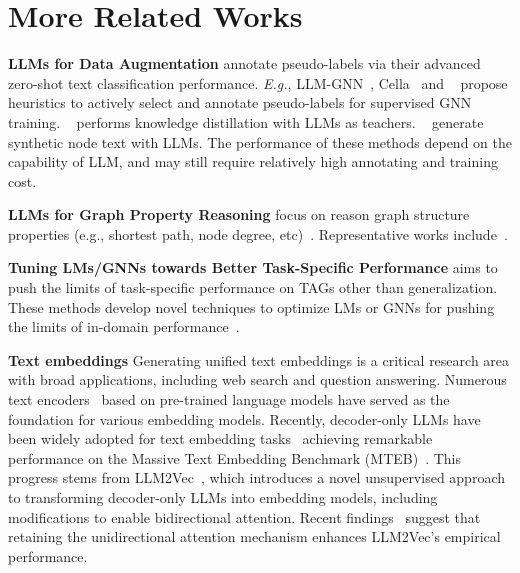 \section{More Related Works}
\label{sec:app_more_related_works}
\textbf{LLMs for Data Augmentation} annotate pseudo-labels via their advanced zero-shot text classification performance. \textit{E.g.}, LLM-GNN~\cite{chen2023label}, Cella~\cite{zhang2024cost} and ~\cite{hu2024low} propose heuristics to actively select and annotate pseudo-labels for supervised GNN training. ~\cite{pan2024distilling} performs knowledge distillation with LLMs as teachers. ~\cite{yu2023empower,li2024enhancing} generate synthetic node text with LLMs. The performance of these methods depend on the capability of LLM, and may still require relatively high annotating and training cost.

\textbf{LLMs for Graph Property Reasoning} focus on reason graph structure properties (e.g., shortest path, node degree, etc)~\cite{tang2024grapharena, dai2024large, yuan2024gracore, ouyang2024gundam}. Representative works include~\cite{perozzi2024let, chen2024graphwiz, zhang2024can, cao2024graphinsight, wei2024gita}.

\textbf{Tuning LMs/GNNs towards Better Task-Specific Performance} aims to push the limits of task-specific performance on TAGs other than generalization. These methods develop novel techniques to optimize LMs or GNNs for pushing the limits of in-domain performance~\cite{chien2021node, duan2023simteg, he2023harnessing, zhao2022learning, zhu2021textgnn, li2021adsgnn, yang2021graphformers, bi2021leveraging, pang2022improving, zolnai2024stage, yang2021graphformers}.

\textbf{Text embeddings} Generating unified text embeddings is a critical research area with broad applications, including web search and question answering. Numerous text encoders~\cite{reimers2019sentence, liu2019roberta, song2020mpnet} based on pre-trained language models have served as the foundation for various embedding models. Recently, decoder-only LLMs have been widely adopted for text embedding tasks~\cite{li2023towards, moreira2024nv} achieving remarkable performance on the Massive Text Embedding Benchmark (MTEB)~\cite{muennighoff2022mteb}. This progress stems from LLM2Vec~\cite{behnamghader2024llm2vec}, which introduces a novel unsupervised approach to transforming decoder-only LLMs into embedding models, including modifications to enable bidirectional attention. Recent findings~\cite{li2024making} suggest that retaining the unidirectional attention mechanism enhances LLM2Vec’s empirical performance.



